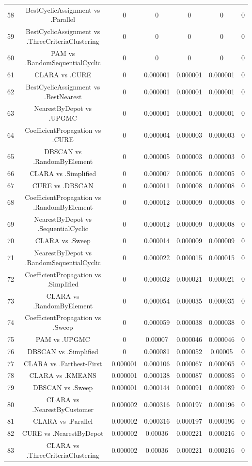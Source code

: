 \documentclass[a4paper,10pt]{article}
\begin{document}
\begin{landscape}
\begin{table}[!htp]
\begin{tabular}{ccccccc}
58&BestCyclicAssignment vs .Parallel&0&0&0&0&0\\
59&BestCyclicAssignment vs .ThreeCriteriaClustering&0&0&0&0&0\\
60&PAM vs .RandomSequentialCyclic&0&0&0&0&0\\
61&CLARA vs .CURE&0&0.000001&0.000001&0.000001&0\\
62&BestCyclicAssignment vs .BestNearest&0&0.000001&0.000001&0.000001&0\\
63&NearestByDepot vs .UPGMC&0&0.000001&0.000001&0.000001&0\\
64&CoefficientPropagation vs .CURE&0&0.000004&0.000003&0.000003&0\\
65&DBSCAN vs .RandomByElement&0&0.000005&0.000003&0.000003&0\\
66&CLARA vs .Simplified&0&0.000007&0.000005&0.000005&0\\
67&CURE vs .DBSCAN&0&0.000011&0.000008&0.000008&0\\
68&CoefficientPropagation vs .RandomByElement&0&0.000012&0.000009&0.000008&0\\
69&NearestByDepot vs .SequentialCyclic&0&0.000012&0.000009&0.000008&0\\
70&CLARA vs .Sweep&0&0.000014&0.000009&0.000009&0\\
71&NearestByDepot vs .RandomSequentialCyclic&0&0.000022&0.000015&0.000015&0\\
72&CoefficientPropagation vs .Simplified&0&0.000032&0.000021&0.000021&0\\
73&CLARA vs .RandomByElement&0&0.000054&0.000035&0.000035&0\\
74&CoefficientPropagation vs .Sweep&0&0.000059&0.000038&0.000038&0\\
75&PAM vs .UPGMC&0&0.00007&0.000046&0.000046&0\\
76&DBSCAN vs .Simplified&0&0.000081&0.000052&0.00005&0\\
77&CLARA vs .Farthest-First&0.000001&0.000106&0.000067&0.000065&0\\
78&CLARA vs .KMEANS&0.000001&0.000138&0.000087&0.000085&0\\
79&DBSCAN vs .Sweep&0.000001&0.000144&0.000091&0.000089&0\\
80&CLARA vs .NearestByCustomer&0.000002&0.000316&0.000197&0.000196&0\\
81&CLARA vs .Parallel&0.000002&0.000316&0.000197&0.000196&0\\
82&CURE vs .NearestByDepot&0.000002&0.00036&0.000221&0.000216&0\\
83&CLARA vs .ThreeCriteriaClustering&0.000002&0.00036&0.000221&0.000216&0\\

\end{tabular}
\end{table}
\end{landscape}
\end{document}
